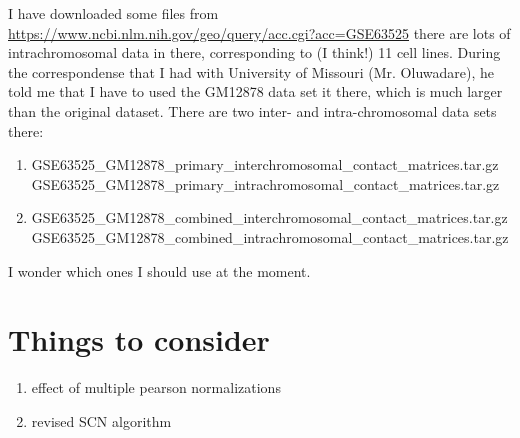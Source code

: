 \documentclass{article}
\begin{document}
\fontsize{13pt}{13pt}\selectfont

\setlength{\parindent}{0pt}
I have downloaded some files from 
\url{https://www.ncbi.nlm.nih.gov/geo/query/acc.cgi?acc=GSE63525}
there are lots of intrachromosomal data in there, corresponding
to (I think!) 11 cell lines. During the correspondense that I had
with University of Missouri (Mr. Oluwadare), he told me that I have
to used the  GM12878 data set it there, which is much larger than
the original \cite{lieberman2009comprehensive} dataset.
There are two inter- and intra-chromosomal data sets there:

\begin{enumerate}
\fontsize{13pt}{3pt}\selectfont
    \item GSE63525\_GM12878\_primary\_interchromosomal\_contact\_matrices.tar.gz\\
          GSE63525\_GM12878\_primary\_intrachromosomal\_contact\_matrices.tar.gz
      \item GSE63525\_GM12878\_combined\_interchromosomal\_contact\_matrices.tar.gz\\
          GSE63525\_GM12878\_combined\_intrachromosomal\_contact\_matrices.tar.gz
\end{enumerate}
I wonder which ones I should use at the moment.

\section*{Things to consider}
\begin{enumerate}
    \item effect of multiple pearson normalizations
    \item revised SCN algorithm
\end{enumerate}
\end{document}
